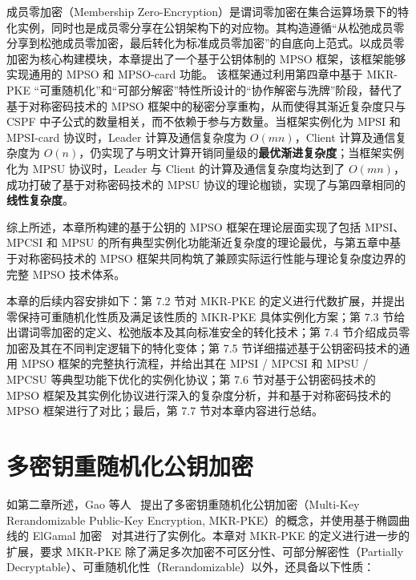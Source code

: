成员零加密（Membership Zero-Encryption）是谓词零加密在集合运算场景下的特化实例，同时也是成员零分享在公钥架构下的对应物。其构造遵循“从松弛成员零分享到松弛成员零加密，最后转化为标准成员零加密”的自底向上范式。以成员零加密为核心构建模块，本章提出了一个基于公钥体制的 MPSO 框架，该框架能够实现通用的 MPSO 和 MPSO-card 功能。
该框架通过利用第四章中基于 MKR-PKE “可重随机化”和“可部分解密”特性所设计的“协作解密与洗牌”阶段，替代了基于对称密码技术的 MPSO 框架中的秘密分享重构，从而使得其渐近复杂度只与 CSPF 中子公式的数量相关，而不依赖于参与方数量。当框架实例化为 MPSI 和 MPSI-card 协议时，Leader 计算及通信复杂度为 $O(mn)$，Client 计算及通信复杂度为 $O(n)$，仍实现了与明文计算开销同量级的\textbf{最优渐进复杂度}；当框架实例化为 MPSU 协议时，Leader 与 Client 的计算及通信复杂度均达到了 $O(mn)$，成功打破了基于对称密码技术的 MPSU 协议的理论枷锁，实现了与第四章相同的\textbf{线性复杂度}。

综上所述，本章所构建的基于公钥的 MPSO 框架在理论层面实现了包括 MPSI、MPCSI 和 MPSU 的所有典型实例化功能渐近复杂度的理论最优，与第五章中基于对称密码技术的 MPSO 框架共同构筑了兼顾实际运行性能与理论复杂度边界的完整 MPSO 技术体系。

本章的后续内容安排如下：第 7.2 节对 MKR-PKE 的定义进行代数扩展，并提出零保持可重随机化性质及满足该性质的 MKR-PKE 具体实例化方案；第 7.3 节给出谓词零加密的定义、松弛版本及其向标准安全的转化技术；第 7.4 节介绍成员零加密及其在不同判定逻辑下的特化变体；第 7.5 节详细描述基于公钥密码技术的通用 MPSO 框架的完整执行流程，并给出其在 MPSI / MPCSI 和 
MPSU / MPCSU 等典型功能下优化的实例化协议；第 7.6 节对基于公钥密码技术的 MPSO 框架及其实例化协议进行深入的复杂度分析，并和基于对称密码技术的 MPSO 框架进行了对比；最后，第 7.7 节对本章内容进行总结。

\section{多密钥重随机化公钥加密}\label{sec:MKR-PKE}

如第二章所述，Gao 等人~\cite{GNT-eprint-2023} 提出了多密钥重随机化公钥加密（Multi-Key Rerandomizable Public-Key Encryption, MKR-PKE）的概念，并使用基于椭圆曲线的 ElGamal 加密~\cite{ElGamal-IEEE-IT-1985} 对其进行了实例化。本章对 MKR-PKE 的定义进行进一步的扩展，要求 MKR-PKE 除了满足多次加密不可区分性、可部分解密性（Partially Decryptable）、可重随机化性（Rerandomizable）以外，还具备以下性质：

